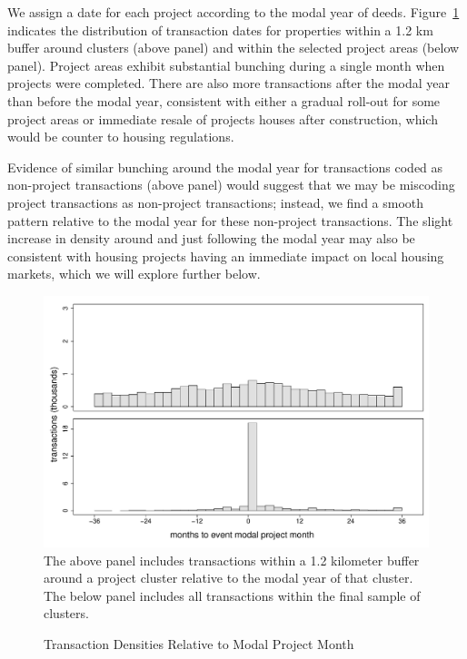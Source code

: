 \documentclass[12pt]{article}
\begin{document}
We assign a date for each project according to the modal year of deeds.  Figure~\ref{figure:densitytime} indicates the distribution of transaction dates for properties within a 1.2 km buffer around clusters (above panel) and within the selected project areas (below panel).  Project areas exhibit substantial bunching during a single month when projects were completed.  There are also more transactions after the modal year than before the modal year, consistent with either a gradual roll-out for some project areas or immediate resale of projects houses after construction, which would be counter to housing regulations.  


Evidence of similar bunching around the modal year for transactions coded as non-project transactions (above panel) would suggest that we may be miscoding project transactions as non-project transactions; instead, we find a smooth pattern relative to the modal year for these non-project transactions.  The slight increase in density around and just following the modal year may also be consistent with housing projects having an immediate impact on local housing markets, which we will explore further below.

\begin{figure}
\caption{Transaction Densities Relative to Modal Project Month}\label{figure:densitytime}
\centering
\includegraphics[scale=.5]{figures/summary_densitytime.pdf} \\
The above panel includes transactions within a 1.2 kilometer buffer around a project cluster relative to the modal year of that cluster.  The below panel includes all transactions within the final sample of clusters.
\end{figure}
\end{document}

